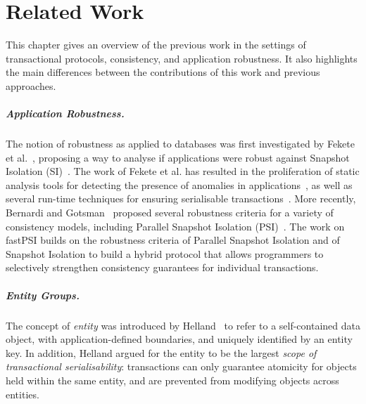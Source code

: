 \cleardoublepage
\chapter{Related Work}
\label{chapter:related_work}

This chapter gives an overview of the previous work in the settings of transactional protocols, consistency, and application robustness. It also highlights the main differences between the contributions of this work and previous approaches.


\paragraph{Application Robustness.} The notion of robustness as applied to databases was first investigated by Fekete et al.~\citep{fekete_ssi}, proposing a way to analyse if applications were robust against Snapshot Isolation (SI)~\citep{sql-critique}. The work of Fekete et al. has resulted in the proliferation of static analysis tools for detecting the presence of anomalies in applications~\citep{sudhir_static}, as well as several run-time techniques for ensuring serialisable transactions~\citep{ports_postgres}. More recently, Bernardi and Gotsman~\citep{concur_robustness} proposed several robustness criteria for a variety of consistency models, including Parallel Snapshot Isolation (PSI)~\citep{psi-intro}. The work on fastPSI builds on the robustness criteria of Parallel Snapshot Isolation and of Snapshot Isolation to build a hybrid protocol that allows programmers to selectively strengthen consistency guarantees for individual transactions.


\paragraph{Entity Groups.} The concept of \emph{entity} was introduced by Helland~\citep{helland_entity} to refer to a self-contained data object, with application-defined boundaries, and uniquely identified by an entity key. In addition, Helland argued for the entity to be the largest \emph{scope of transactional serialisability}: transactions can only guarantee atomicity for objects held within the same entity, and are prevented from modifying objects across entities.

